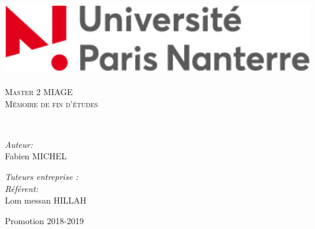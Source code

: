 \begin{titlepage}
\begin{center}

\includegraphics[width=1\textwidth]{./upn}~\\[1cm]

\textsc{\Huge Master 2 MIAGE}\\[0.5cm]

\textsc{\huge Mémoire de fin d'études}\\[1.5cm]



\HRule

{\huge \bfseries \thetitle \\[0.4cm] }


\HRule

\vspace{5mm}

\begin{minipage}{0.4\textwidth}
\begin{flushleft} \large
\emph{Auteur:}\\
Fabien \textsc{MICHEL}
\end{flushleft}
\end{minipage}
\begin{minipage}{0.4\textwidth}
\begin{flushright} \large
\emph{Tuteurs entreprise :} \\
\emph{Référent:} \\
Lom messan \textsc{HILLAH}
\end{flushright}
\end{minipage}

\vfill

{\huge Promotion 2018-2019}

\end{center}
\end{titlepage}